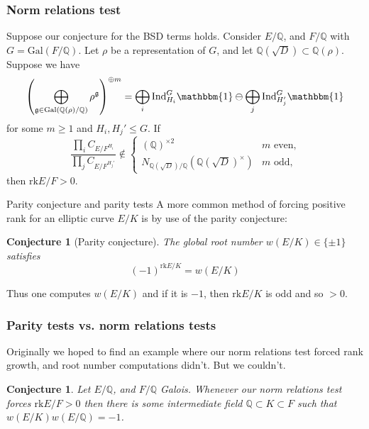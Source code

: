 \documentclass{beamer}
\newcommand{\Gal}{\mathrm{Gal}}
\newcommand{\rk}{\mathrm{rk}}
\newcommand{\Ind}{\mathrm{Ind}}
\newcommand{\QQ}{\mathbb{Q}}
\newcommand{\bQ}{\mathbb{Q}}
\theoremstyle{plain}
\newtheorem{conjecture}[thm]{Conjecture}
\begin{document}
\begin{frame}
    \frametitle{Norm relations test}
    \begin{theorem}\label{thm_positive_rank}
    \small{  Suppose our conjecture for the BSD terms holds. Consider $E/\QQ$, and $F/\QQ$  with $G = \Gal(F / \bQ)$. Let $\rho$ be a representation of $G$, and let $\bQ(\sqrt{D}) \subset \bQ(\rho)$. Suppose we have  
        $$\left(\bigoplus_{\mathfrak{g}\in\Gal(\QQ(\rho)/\QQ)}\rho^{\mathfrak{g}}\right)^{\oplus m}=\bigoplus_i\Ind_{H_i}^G\mathbbm{1}\ominus\bigoplus_j\Ind_{H'_j}^G\mathbbm{1}$$
        for some $m\geq 1$ and $H_i, H_j' \leq G$. If 
        $$\frac{\prod_i C_{E/F^{H_i}}}{\prod_j C_{E/F^{H_j'}}} \not\in
        \begin{cases}
            (\bQ)^{\times 2} & m \text{ even,}\\
            N_{\bQ(\sqrt{D}) / \bQ}(\bQ(\sqrt{D})^{\times}) & m \text{ odd,}
        \end{cases}
        $$
        then $\rk E / F > 0.$ }
    \end{theorem}
\end{frame}

\begin{frame}{Parity conjecture and parity tests}
    A more common method of forcing positive rank for an elliptic curve $E / K$ is by use of the parity conjecture:
    \begin{conjecture}[Parity conjecture]\label{parity}
            The \textit{global root number} $w(E / K) \in \{ \pm 1 \}$ satisfies 
            $$(-1)^{\rk E / K} = w(E / K)$$
    \end{conjecture} \pause
    
    Thus one computes $w(E / K)$ and if it is $-1$, then $\rk E / K$ is odd and so $> 0$. 

\end{frame}

\begin{frame}
    \frametitle{Parity tests vs. norm relations tests}

    Originally we hoped to find an example where our norm relations test forced rank growth, and root number computations didn't. \pause But we couldn't. \pause \text{:(} \pause

    \begin{conjecture}
        Let $E / \bQ$, and $F / \bQ$ Galois. Whenever our norm relations test forces $\rk E / F >0$ then there is some intermediate field $\bQ \subset K \subset F$ such that $w(E / K)w(E / \bQ) = -1$.
    \end{conjecture}
\end{frame}
\end{document}
